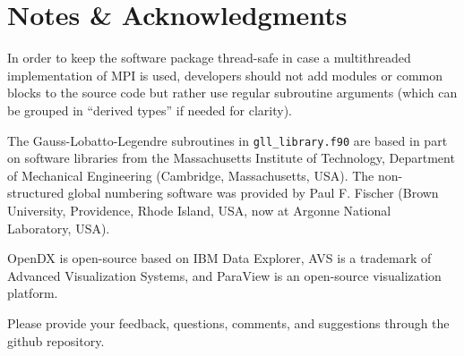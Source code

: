 
\chapter*{Notes \& Acknowledgments}

In order to keep the software package thread-safe in case a multithreaded
implementation of MPI is used, developers should not add modules or
common blocks to the source code but rather use regular subroutine
arguments (which can be grouped in ``derived types'' if needed for
clarity).

The Gauss-Lobatto-Legendre subroutines in \texttt{gll\_library.f90}
are based in part on software libraries from the Massachusetts Institute
of Technology, Department of Mechanical Engineering (Cambridge, Massachusetts,
USA). The non-structured global numbering software was provided by
Paul F. Fischer (Brown University, Providence, Rhode Island, USA,
now at Argonne National Laboratory, USA).

OpenDX  is open-source
based on IBM Data Explorer, AVS 
is a trademark of Advanced Visualization Systems, and ParaView 
is an open-source visualization platform.\newline

Please provide your feedback, questions, comments, and suggestions through the github repository.

